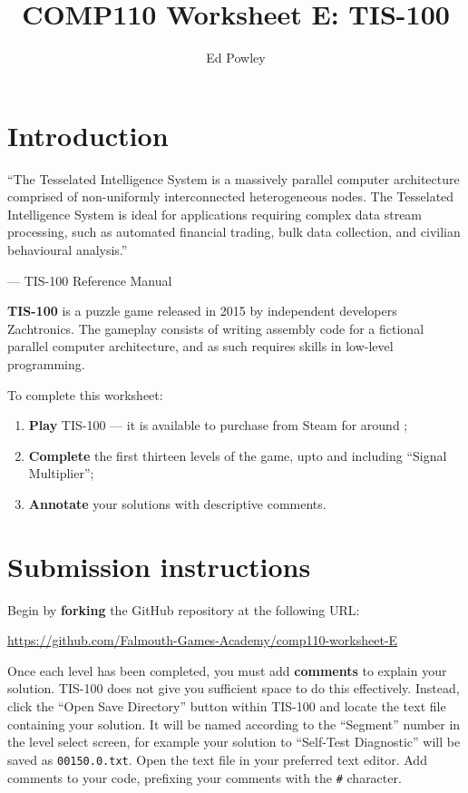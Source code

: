 \documentclass{../../../fal_assignment}
\title{COMP110 Worksheet E: TIS-100}
\author{Ed Powley}
\begin{document}
\maketitle

\section*{Introduction}

\begin{marginquote}
``The Tesselated Intelligence System is a massively parallel computer architecture comprised of non-uniformly
interconnected heterogeneous nodes. The Tesselated Intelligence System is ideal for applications requiring complex
data stream processing, such as automated financial trading, bulk data collection, and civilian behavioural analysis.''

--- TIS-100 Reference Manual
\end{marginquote}

\textbf{TIS-100} is a puzzle game released in 2015 by independent developers Zachtronics.
The gameplay consists of writing assembly code for a fictional parallel computer architecture,
and as such requires skills in low-level programming.

To complete this worksheet:
\begin{enumerate}[label=(\alph*)]
	\item \textbf{Play} TIS-100 --- it is available to purchase from Steam for around ;
 	\item \textbf{Complete} the first thirteen levels of the game, upto and including ``Signal Multiplier'';
 	\item \textbf{Annotate} your solutions with descriptive comments.
\end{enumerate}

\section*{Submission instructions}

Begin by \textbf{forking} the GitHub repository at the following URL:

\url{https://github.com/Falmouth-Games-Academy/comp110-worksheet-E}

Once each level has been completed, you must add \textbf{comments} to explain your solution.
TIS-100 does not give you sufficient space to do this effectively.
Instead, click the ``Open Save Directory'' button within TIS-100 and locate
the text file containing your solution.
It will be named according to the ``Segment'' number in the level select screen, for example your solution to
``Self-Test Diagnostic'' will be saved as \texttt{00150.0.txt}.
Open the text file in your preferred text editor.
Add comments to your code, prefixing your comments with the \texttt{\#} character.
\end{document}
